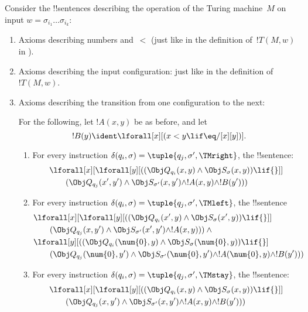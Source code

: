 \documentclass[../../../include/open-logic-section]{subfiles}
\begin{document}
Consider the !!{sentence}s describing the operation of the Turing
machine~$M$ on input $w = \sigma_{i_1}\dots\sigma_{i_k}$:
\begin{enumerate}
\item Axioms describing numbers and~$<$ (just like in the definition
of~$!T(M,w)$ in ).
\item Axioms describing the input configuration: just like in the definition
of~$!T(M,w)$.
\item Axioms describing the transition from one configuration to
  the next:

For the following, let $!A(x, y)$ be as before, and let
\[
  !B(y) \ident \lforall[x][(x < y \lif \eq/[x][y])].
\]
\begin{enumerate}
\item {} For every instruction $\delta(q_i, \sigma) =
  \tuple{q_j, \sigma', \TMright}$, the !!{sentence}:
\begin{align*}
& \lforall[x][\lforall[y][(
   (\Obj Q_{q_i}(x, y) \land \Obj S_{\sigma}(x, y)) \lif {}]] \\
&\qquad   (\Obj Q_{q_j}(x', y') \land \Obj S_{\sigma'}(x, y') \land
!A(x, y) \land !B(y')))
\end{align*}
\item {} For every instruction $\delta(q_i, \sigma) =
  \tuple{q_j, \sigma', \TMleft}$, the !!{sentence}
\begin{align*}
& \lforall[x][\lforall[y][
    ((\Obj Q_{q_i}(x', y) \land \Obj S_{\sigma}(x', y)) \lif {}]]\\
& \qquad   (\Obj Q_{q_j}(x, y') \land \Obj S_{\sigma'}(x', y') \land
!A(x, y))) \land {}\\
& \lforall[y][((\Obj Q_{q_i}(\num{0}, y) \land \Obj S_{\sigma}(\num{0},
    y)) \lif {}]\\
& \qquad (\Obj Q_{q_j}(\num{0}, y') \land \Obj S_{\sigma'}(\num{0},
  y') \land !A(\num{0}, y) \land !B(y')))
\end{align*}
\item {} For every instruction $\delta(q_i, \sigma) =
  \tuple{q_j, \sigma', \TMstay}$, the !!{sentence}:
\begin{align*}
& \lforall[x][\lforall[y][(
   (\Obj Q_{q_i}(x, y) \land \Obj S_{\sigma}(x, y)) \lif {}]] \\
&\qquad (\Obj Q_{q_j}(x, y') \land \Obj S_{\sigma'}(x, y') \land
!A(x, y) \land !B(y')))
\end{align*}
\end{enumerate}

\end{enumerate}
\end{document}
